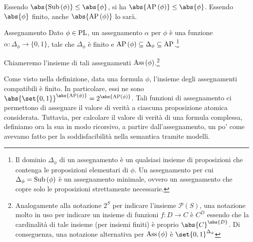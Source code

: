 Essendo \(\abs{\Sub{\phi}}\leq \abs{\phi}\), si ha \(\abs{\AP[\phi]}\leq \abs{\phi}\). Essendo \(\abs{\phi}\) finito, anche \(\abs{\AP[\phi]}\) lo sarà.

\begin{definition}{Assegnamento}
  Dato \(\phi \in \operatorname{PL}\), un assegnamento \(\alpha\) per \(\phi\) è una funzione \(\alpha: \Delta_\phi \rightarrow \{0,1\}\), tale che \(\Delta_\phi\) è finito e \(\AP[\phi] \subseteq \Delta_\phi \subseteq \AP\).\footnote{Il dominio \(\Delta_{\phi}\) di un assegnamento è un qualsiasi insieme di proposizioni che contenga le proposizioni elementari di \(\phi\). Un assegnamento per cui \(\Delta_{\phi}=\operatorname{Sub}\left(\phi\right)\) è un assegnamento minimale, ovvero un assegnamento che copre solo le proposizioni strettamente necessarie.}

  Chiameremo l'insieme di tali assegnamenti \(\operatorname{Ass}\left(\phi\right)\).\footnote{Analogamente alla notazione \(2^S\) per indicare l'insieme \(\mathcal{P}(S)\), una notazione molto in uso per indicare un insieme di funzioni \(f: D \to C\) è \(C^D\) essendo che la cardinalità di tale insieme (per insiemi finiti) è proprio \(\abs{C}^{\abs{D}}\). Di conseguenza, una notazione alternativa per \(\operatorname{Ass}\left(\phi\right)\) è \(\set{0,1}^{\Delta_\phi}\)}
\end{definition}

Come visto nella definizione, data una formula \(\phi\), l'insieme degli assegnamenti compatibili è finito.
In particolare, essi ne sono \(\abs{\set{0,1}}^{\abs{\AP[\phi]}}=2^{\abs{\AP[\phi]}}\).
Tali funzioni di assegnamento ci permettono di assegnare il valore di verità a ciascuna proposizione atomica considerata. 
Tuttavia, per calcolare il valore di verità di una formula complessa, definiamo ora la sua  in modo ricorsivo, a partire dall'assegnamento, un po' come avevamo fatto per la soddisfacibilità nella semantica tramite modelli.

